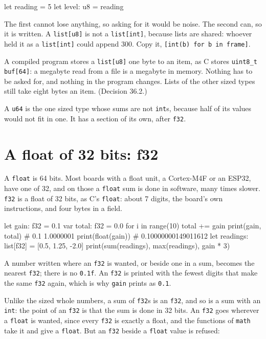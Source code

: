 \begin{zeno}[fails=yes]
let reading = 5
let level: u8 = reading
\end{zeno}

The first cannot lose anything, so asking for it would be noise. The
second can, so it is written. A \verb|list[u8]| is not a
\verb|list[int]|, because lists are shared: whoever held it as a
\verb|list[int]| could append 300. Copy it,
\verb|[int(b) for b in frame]|.

A compiled program stores a \verb|list[u8]| one byte to an item, as C
stores \verb|uint8_t buf[64]|: a megabyte read from a file is a
megabyte in memory. Nothing has to be asked for, and nothing in the
program changes. Lists of the other sized types still take eight bytes
an item. (Decision 36.2.)

A \verb|u64| is the one sized type whose sums are not \verb|int|s,
because half of its values would not fit in one. It has a section of
its own, after \verb|f32|.

\section{A float of 32 bits: f32}

A \verb|float| is 64 bits. Most boards with a float unit, a
Cortex-M4F or an ESP32, have one of 32, and on those a \verb|float|
sum is done in software, many times slower. \verb|f32| is a float of
32 bits, as C's \verb|float|: about 7 digits, the board's own
instructions, and four bytes in a field.

\begin{zeno}
let gain: f32 = 0.1
var total: f32 = 0.0
for i in range(10) {
    total += gain
}
print(gain, total)       # 0.1 1.0000001
print(float(gain))       # 0.10000000149011612
let readings: list[f32] = [0.5, 1.25, -2.0]
print(sum(readings), max(readings), gain * 3)
\end{zeno}

A number written where an \verb|f32| is wanted, or beside one in a
sum, becomes the nearest \verb|f32|; there is no \verb|0.1f|. An
\verb|f32| is printed with the fewest digits that make the same
\verb|f32| again, which is why \verb|gain| prints as \verb|0.1|.

Unlike the sized whole numbers, a sum of \verb|f32|s is an \verb|f32|,
and so is a sum with an \verb|int|: the point of an \verb|f32| is that
the sum is done in 32 bits. An \verb|f32| goes wherever a \verb|float|
is wanted, since every \verb|f32| is exactly a float, and the
functions of \verb|math| take it and give a \verb|float|. But an
\verb|f32| beside a \verb|float| value is refused:

